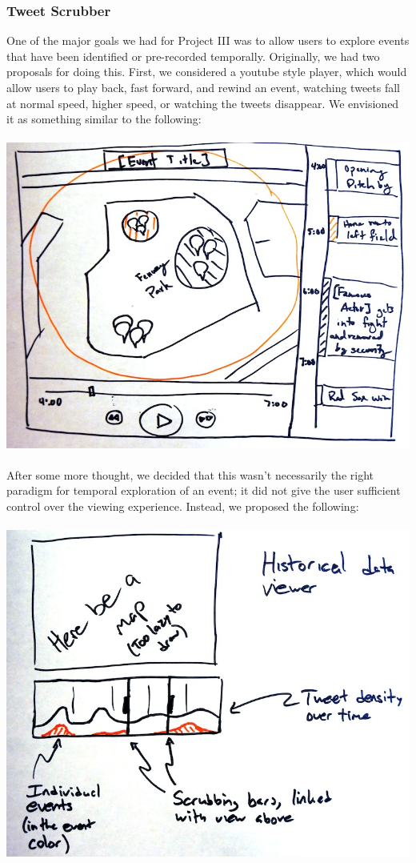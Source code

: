 \documentclass[pdftex,12pt,a4paper]{article}
\begin{document}
\subsubsection{Tweet Scrubber}
One of the major goals we had for Project III was to allow users to explore events that have been identified or pre-recorded temporally. Originally, we had two proposals for doing this. First, we considered a youtube style player, which would allow users to play back, fast forward, and rewind an event, watching tweets fall at normal speed, higher speed, or watching the tweets disappear. We envisioned it as something similar to the following:\\ \\
\includegraphics[width=5.5in]{pheme3.jpg} \\ \\
After some more thought, we decided that this wasn't necessarily the right paradigm for temporal exploration of an event; it did not give the user sufficient control over the viewing experience. Instead, we proposed the following: \\ \\
\includegraphics[width=5.5in]{pheme5.jpg} \\ \\
\end{document}
